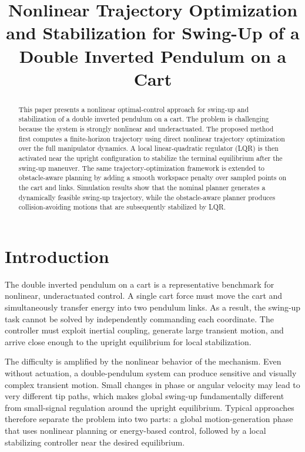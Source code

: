 \documentclass[conference]{IEEEtran}
\title{
Nonlinear Trajectory Optimization and Stabilization for Swing-Up of a Double Inverted Pendulum on a Cart
}
\author{
\IEEEauthorblockN{JunYoung Kim}
\IEEEauthorblockA{Department of Mechanical and Aerospace Engineering\\
MAE589: Advanced Robotics Course Project Report}
}
\begin{document}
\maketitle
\thispagestyle{empty}
\pagestyle{empty}

\begin{abstract}
This paper presents a nonlinear optimal-control approach for swing-up and stabilization of a double inverted pendulum on a cart. The problem is challenging because the system is strongly nonlinear and underactuated. The proposed method first computes a finite-horizon trajectory using direct nonlinear trajectory optimization over the full manipulator dynamics. A local linear-quadratic regulator (LQR) is then activated near the upright configuration to stabilize the terminal equilibrium after the swing-up maneuver. The same trajectory-optimization framework is extended to obstacle-aware planning by adding a smooth workspace penalty over sampled points on the cart and links. Simulation results show that the nominal planner generates a dynamically feasible swing-up trajectory, while the obstacle-aware planner produces collision-avoiding motions that are subsequently stabilized by LQR.
\end{abstract}

\section{Introduction}
The double inverted pendulum on a cart is a representative benchmark for nonlinear, underactuated control. A single cart force must move the cart and simultaneously transfer energy into two pendulum links. As a result, the swing-up task cannot be solved by independently commanding each coordinate. The controller must exploit inertial coupling, generate large transient motion, and arrive close enough to the upright equilibrium for local stabilization.

The difficulty is amplified by the nonlinear behavior of the mechanism. Even without actuation, a double-pendulum system can produce sensitive and visually complex transient motion. Small changes in phase or angular velocity may lead to very different tip paths, which makes global swing-up fundamentally different from small-signal regulation around the upright equilibrium. Typical approaches therefore separate the problem into two parts: a global motion-generation phase that uses nonlinear planning or energy-based control, followed by a local stabilizing controller near the desired equilibrium.
\end{document}
